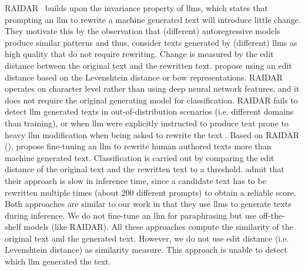 RAIDAR~\cite{mao_raidar_2024} builds upon the invariance property of \acp{llm}, which states that prompting an \ac{llm} to rewrite a machine generated text will introduce little change.
They motivate this by the observation that (different) autoregressive models produce similar patterns and thus, 
consider texts generated by (different) \acp{llm} as high quality that do not require rewriting.
Change is measured by the edit distance between the original text and the rewritten text. 
\citet{mao_raidar_2024} propose using an edit distance based on the Levenshtein distance or \ac{bow} representations.
RAIDAR operates on character level rather than using deep neural network features, and it does not require the original generating model for classification. 
RAIDAR fails to detect \ac{llm} generated texts in out-of-distribution scenarios (i.e. different domains than training), 
or when \ac{llm} were explicitly instructed to produce text prone to heavy \ac{llm} modification when being asked to rewrite the text \cite{li_learning_2025}.
Based on RAIDAR (\cite{mao_raidar_2024}), \citet{li_learning_2025} propose fine-tuning an \ac{llm} to rewrite human authored texts more than machine generated text.
Classification is carried out by comparing the edit distance of the original text and the rewritten text to a threshold.
\citet{li_learning_2025} admit that their approach is slow in inference time, since a candidate text has to be rewritten multiple times (about 200 different prompts) to obtain a reliable score.
Both approaches are similar to our work in that they use \acp{llm} to generate texts during inference.
We do not fine-tune an \ac{llm} for paraphrasing but use off-the-shelf models (like RAIDAR).
All these approaches compute the similarity of the original text and the generated text.
However, we do not use edit distance (i.e. Levenshtein distance) as similarity measure.
This approach is unable to detect which \ac{llm} generated the text.

